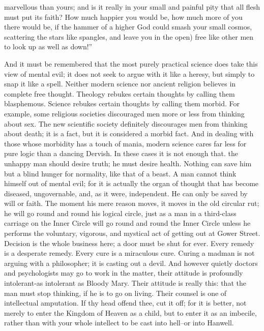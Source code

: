 \documentclass{book}
\begin{document}
marvellous than yours; and is it really in your small and painful pity that all flesh must put its faith? How much happier you would be, how much more of you there would be, if the hammer of a higher God could smash your small cosmos, scattering the stars like spangles, and leave you in the open) free like other men to look up as well as down!”

And it must be remembered that the most purely practical science does take this view of mental evil; it does not seek to argue with it like a heresy, but simply to snap it like a spell. Neither modern science nor ancient religion believes in complete free thought. Theology rebukes certain thoughts by calling them blasphemous. Science rebukes certain thoughts by calling them morbid. For example, some religious societies discouraged men more or less from thinking about sex. The new scientific society definitely discourages men from thinking about death; it is a fact, but it is considered a morbid fact. And in dealing with those whose morbidity has a touch of mania, modern science cares far less for pure logic than a dancing Dervish. In these cases it is not enough that. the unhappy man should desire truth; he must desire health. Nothing can save him but a blind hunger for normality, like that of a beast. A man cannot think himself out of mental evil; for it is actually the organ of thought that has become diseased, ungovernable, and, as it were, independent. He can only be saved by will or faith. The moment his mere reason moves, it moves in the old circular rut; he will go round and round his logical circle, just as a man in a third-class carriage on the Inner Circle will go round and round the Inner Circle unless he performs the voluntary, vigorous, and mystical act of getting out at Gower Street. Decision is the whole business here; a door must be shut for ever. Every remedy is a desperate remedy. Every cure is a miraculous cure. Curing a madman is not arguing with a philosopher; it is casting out a devil. And however quietly doctors and psychologists may go to work in the matter, their attitude is profoundly intolerant-as intolerant as Bloody Mary. Their attitude is really this: that the man must stop thinking, if he is to go on living. Their counsel is one of intellectual amputation. If thy head offend thee, cut it off; for it is better, not merely to enter the Kingdom of Heaven as a child, but to enter it as an imbecile, rather than with your whole intellect to be cast into hell–or into Hanwell.
\end{document}
